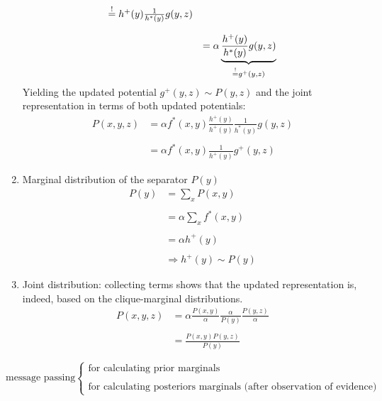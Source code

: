 \begin{enumerate}[(1)]
\begin{equation}
\begin{array}{ll}
{				\ensuremath{\stackrel{\mathrm{!}}{=}}h^+(y)} \frac{1}{h^*(y)} g(y,z)\\\\
		& = \alpha \underbrace{\frac{h^+(y)}{h^*(y)} g(y,z)}_{
				 \stackrel{\mathrm{!}}{=} g^+(y,z)}
	\end{array}
\end{equation}
Yielding the updated potential $g^+(y,z) \sim P(y,z)$ and the joint representation in terms of both updated potentials: 
\begin{equation}
	\begin{array}{ll}
		P(x,y,z) 
		& = \alpha f^*(x,y) \frac{h^+(y)}{h^+(y)}
			\frac{1}{h^*(y)} g(y,z)  \\\\
		& = \alpha f^*(x,y) \frac{1}{h^+(y)} g^+(y,z)
	\end{array}
\end{equation}
\item Marginal distribution of the separator $P(y)$
 \begin{equation}
	\begin{array}{ll}
		P(y) 
		& = \sum\limits_x P(x,y) \\\\
		& = \alpha \sum\limits_x f^*(x,y)\\\\
		& = \alpha h^+(y) \\\\
		& \Rightarrow h^+(y) \sim P(y)
	\end{array}
\end{equation}
\item Joint distribution: collecting terms shows that the updated representation is, indeed, based on the clique-marginal distributions. 
\begin{equation}
	\begin{array}{ll}
		P(x,y,z) 
		& = \alpha \frac{P(x,y)}{\alpha}
			\frac{\alpha}{P(y)} 
			\frac{P(y,z)}{\alpha}\\\\
		& = \frac{P(x,y)P(y,z)}{P(y)}
	\end{array}
\end{equation}
\end{enumerate}
\[ \text{message passing} \left \{ \begin{array}{l}
	\text{for calculating prior marginals} \\\\
	\text{for calculating posteriors marginals (after observation of 
		evidence)}
\end{array} \right. \]

